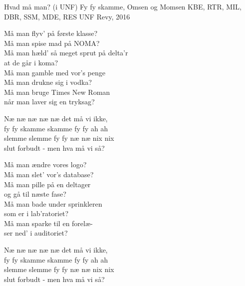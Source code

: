 \begin{song}{Hvad må man? (i UNF)}
  {} %
  {Fy fy skamme, Omsen og Momsen} %
  {KBE, RTR, MIL, DBR, SSM, MDE, RES} %
  {UNF Revy, 2016} %
  {\NotCCLIed} %

  \begin{SBVerse}
    Må man flyv’ på første klasse?\\
    Må man spise mad på NOMA?\\
    Må man hæld’ så meget sprut på delta’r\\
    at de går i koma?\\\medskip
    Må man gamble med vor’s penge \\
    Må man drukne sig i vodka?\\
    Må man bruge Times New Roman \\
    når man laver sig en tryksag?
  \end{SBVerse}

  \begin{SBChorus}
    Næ næ næ næ næ det må vi ikke,\\
    fy fy skamme skamme fy fy ah ah\\
    slemme slemme fy fy næ næ nix nix\\
    slut forbudt - men hva må vi så?
  \end{SBChorus}

  \begin{SBVerse}
    Må man ændre vores logo?\\
    Må man slet’ vor’s database?\\
    Må man pille på en deltager \\
    og gå til næste fase?\\\medskip
    Må man bade under sprinkleren\\
    som er i lab’ratoriet?\\
    Må man sparke til en forelæ-\\
    ser ned’ i auditoriet?
  \end{SBVerse}

  \begin{SBChorus}
    Næ næ næ næ næ det må vi ikke,\\
    fy fy skamme skamme fy fy ah ah\\
    slemme slemme fy fy næ næ nix nix\\
    slut forbudt - men hva må vi så?
  \end{SBChorus}


\end{song}
